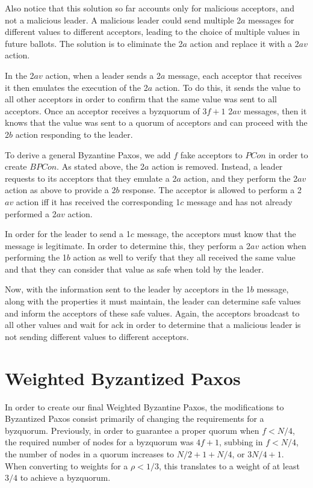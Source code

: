 \documentclass[conference]{IEEEtran}
\begin{document}
Also notice that this solution so far accounts only for malicious acceptors, and not a malicious leader. A malicious leader could send multiple 2$a$ messages for different values to different acceptors, leading to the choice of multiple values in future ballots. The solution is to eliminate the 2$a$ action and replace it with a 2$av$ action.

In the 2$av$ action, when a leader sends a 2$a$ message, each acceptor that receives it then emulates the execution of the 2$a$ action. To do this, it sends the value to all other acceptors in order to confirm that the same value was sent to all acceptors. Once an acceptor receives a byzquorum of $3f + 1$ 2$av$ messages, then it knows that the value was sent to a quorum of acceptors and can proceed with the 2$b$ action responding to the leader.
 
To derive a general Byzantine Paxos, we add $f$ fake acceptors to $PCon$ in order to create $BPCon$. As stated above, the 2$a$ action is removed. Instead, a leader requests to its acceptors that they emulate a 2$a$ action, and they perform the 2$av$ action as above to provide a 2$b$ response. The acceptor is allowed to perform a 2$av$ action iff it has received the corresponding 1$c$ message and has not already performed a 2$av$ action.

In order for the leader to send a 1$c$ message, the acceptors must know that the message is legitimate. In order to determine this, they perform a 2$av$ action when performing the 1$b$ action as well to verify that they all received the same value and that they can consider that value as safe when told by the leader.

Now, with the information sent to the leader by acceptors in the 1$b$ message, along with the properties it must maintain, the leader can determine safe values and inform the acceptors of these safe values. Again, the acceptors broadcast to all other values and wait for ack in order to determine that a malicious leader is not sending different values to different acceptors.

\section{Weighted Byzantized Paxos}
In order to create our final Weighted Byzantine Paxos, the modifications to Byzantized Paxos consist primarily of changing the requirements for a byzquorum. Previously, in order to guarantee a proper quorum when $f < N/4$, the required number of nodes for a byzquorum was $4f+ 1$, subbing in $f < N/4$, the number of nodes in a quorum increases to $N/2 + 1 + N/4$, or $3N/4 + 1$. When converting to weights for a $\rho < 1/3$, this translates to a weight of at least $3/4$ to achieve a byzquorum.
\end{document}
